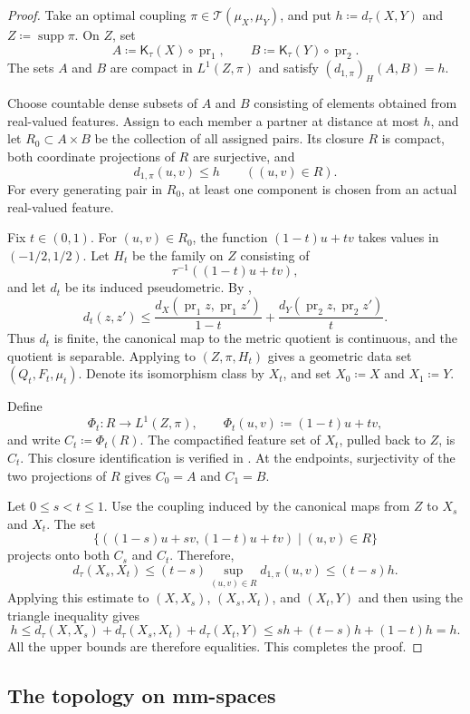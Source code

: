 \documentclass[10pt,a4paper]{amsart}
\newcommand{\T}{\mathcal T}
\newcommand{\Kc}{\mathsf K}
\newcommand{\dtau}{d_{\tau}}
\DeclareMathOperator{\pr}{pr}
\DeclareMathOperator{\supp}{supp}
\begin{document}
\begin{proof}
Take an optimal coupling $\pi\in\T(\mu_X,\mu_Y)$, and put $h\coloneqq\dtau(X,Y)$ and $Z\coloneqq\supp\pi$. On $Z$, set
\[
A\coloneqq\Kc_\tau(X)\circ\pr_1,\qquad
B\coloneqq\Kc_\tau(Y)\circ\pr_2.
\]
The sets $A$ and $B$ are compact in $L^1(Z,\pi)$ and satisfy $(d_{1,\pi})_H(A,B)=h$.

Choose countable dense subsets of $A$ and $B$ consisting of elements obtained from real-valued features. Assign to each member a partner at distance at most $h$, and let $R_0\subset A\times B$ be the collection of all assigned pairs. Its closure $R$ is compact, both coordinate projections of $R$ are surjective, and
\[
d_{1,\pi}(u,v)\leq h\qquad((u,v)\in R).
\]
For every generating pair in $R_0$, at least one component is chosen from an actual real-valued feature.

Fix $t\in(0,1)$. For $(u,v)\in R_0$, the function $(1-t)u+tv$ takes values in $(-1/2,1/2)$. Let $H_t$ be the family on $Z$ consisting of
\[
\tau^{-1}((1-t)u+tv),
\]
and let $d_t$ be its induced pseudometric. By ,
\[
d_t(z,z')\leq
\frac{d_X(\pr_1z,\pr_1z')}{1-t}
+\frac{d_Y(\pr_2z,\pr_2z')}{t}.
\]
Thus $d_t$ is finite, the canonical map to the metric quotient is continuous, and the quotient is separable. Applying  to $(Z,\pi,H_t)$ gives a geometric data set $(Q_t,F_t,\mu_t)$. Denote its isomorphism class by $X_t$, and set $X_0\coloneqq X$ and $X_1\coloneqq Y$.

Define
\[
\Phi_t\colon R\longrightarrow L^1(Z,\pi),\qquad
\Phi_t(u,v)\coloneqq(1-t)u+tv,
\]
and write $C_t\coloneqq\Phi_t(R)$. The compactified feature set of $X_t$, pulled back to $Z$, is $C_t$. This closure identification is verified in . At the endpoints, surjectivity of the two projections of $R$ gives $C_0=A$ and $C_1=B$.

Let $0\leq s<t\leq1$. Use the coupling induced by the canonical maps from $Z$ to $X_s$ and $X_t$. The set
\[
\{((1-s)u+sv,(1-t)u+tv)\mid(u,v)\in R\}
\]
projects onto both $C_s$ and $C_t$. Therefore,
\[
\dtau(X_s,X_t)
\leq(t-s)\sup_{(u,v)\in R}d_{1,\pi}(u,v)
\leq(t-s)h.
\]
Applying this estimate to $(X,X_s)$, $(X_s,X_t)$, and $(X_t,Y)$ and then using the triangle inequality gives
\[
h\leq\dtau(X,X_s)+\dtau(X_s,X_t)+\dtau(X_t,Y)
\leq sh+(t-s)h+(1-t)h=h.
\]
All the upper bounds are therefore equalities. This completes the proof.
\end{proof}

\subsection{The topology on mm-spaces}
\label{subsec:mm-topology}
\end{document}
